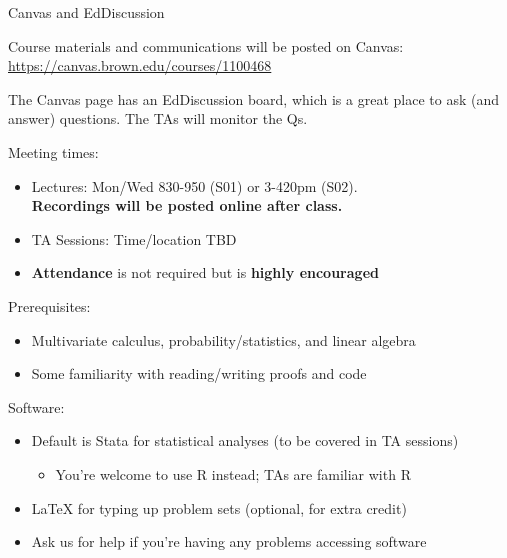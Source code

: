 \documentclass[11pt,english,handout]{beamer}
\begin{document}
\begin{frame}{Canvas and EdDiscussion}

Course materials and communications will be posted on Canvas: {\url{https://canvas.brown.edu/courses/1100468}} \bigskip 

The Canvas page has an EdDiscussion board, which is a great place to ask (and answer) questions. The TAs will monitor the Qs.

\end{frame}

\begin{frame}
\vspace{0.2cm}
Meeting times:

\begin{itemize}
\item Lectures: Mon/Wed 830-950 (S01) or 3-420pm (S02).\\ \textbf{Recordings will be posted online after class.}
\vspace{0.1cm}
\item TA Sessions: Time/location TBD


\vspace{0.1cm}
\item \textbf{Attendance} is not required but is \textbf{highly encouraged}
\end{itemize}
\vspace{0.3cm}

\pause{}

Prerequisites:

\begin{itemize}
\item Multivariate calculus, probability/statistics, and linear algebra
\vspace{0.1cm}
\item Some familiarity with reading/writing proofs and code
\end{itemize}
\vspace{0.2cm}

\pause{}

Software:

\begin{itemize}
\item Default is Stata for statistical analyses (to be covered in TA sessions)
	\begin{itemize}
		\item 
		You're welcome to use R instead; TAs are familiar with R
	\end{itemize}
\vspace{0.1cm}
\item LaTeX for typing up problem sets (optional, for extra credit)
\vspace{0.1cm}
\item Ask us for help if you're having any problems accessing software
\end{itemize}

\end{frame}
\end{document}
